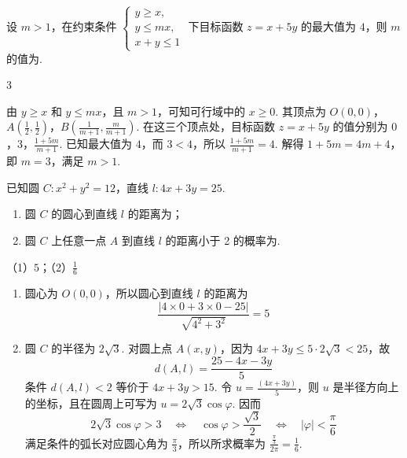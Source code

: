 \begin{problem}
设 \(m > 1\)，在约束条件 \(\begin{cases}
y \geqslant x,\\
y \leqslant mx,\\
x + y \leqslant 1
\end{cases}\) 下目标函数 \(z = x + 5y\) 的最大值为 \(4\)，则 \(m\) 的值为\fillinblank{}.
\end{problem}

\begin{answer}
3
\end{answer}

\begin{solution}
由 \(y\geqslant x\) 和 \(y\leqslant mx\)，且 \(m>1\)，可知可行域中的 \(x\geqslant0\). 其顶点为
\(O(0,0)\)，\(A\left(\frac12,\frac12\right)\)，\(B\left(\frac{1}{m+1},\frac{m}{m+1}\right)\).
在这三个顶点处，目标函数 \(z=x+5y\) 的值分别为
\(0\)，\(3\)，\(\frac{1+5m}{m+1}\).
已知最大值为 \(4\)，而 \(3<4\)，所以
\(\frac{1+5m}{m+1}=4\). 解得 \(1+5m=4m+4\)，即 \(m=3\)，满足 \(m>1\).
\end{solution}

\begin{problem}
已知圆 \(C: x^{2} + y^{2} = 12\)，直线 \(l: 4x + 3y = 25\).
\begin{enumerate}
\item 圆 \(C\) 的圆心到直线 \(l\) 的距离为\fillinblank{}；
\item 圆 \(C\) 上任意一点 \(A\) 到直线 \(l\) 的距离小于 2 的概率为\fillinblank{}.
\end{enumerate}
\end{problem}

\begin{answer}
（1）\(5\)；（2）\(\frac{1}{6}\)
\end{answer}

\begin{solution}
\begin{enumerate}
\item 圆心为 \(O(0,0)\)，所以圆心到直线 \(l\) 的距离为
\[
\frac{|4\times0+3\times0-25|}{\sqrt{4^2+3^2}}=5
\]
\item 圆 \(C\) 的半径为 \(2\sqrt3\). 对圆上点 \(A(x,y)\)，因为
\(4x+3y\leqslant5\cdot2\sqrt3<25\)，故
\[
d(A,l)=\frac{25-4x-3y}{5}
\]
条件 \(d(A,l)<2\) 等价于 \(4x+3y>15\). 令
\(u=\frac{(4x+3y)}{5}\)，则 \(u\) 是半径方向上的坐标，且在圆周上可写为
\(u=2\sqrt3\cos\varphi\). 因而
\[
2\sqrt3\cos\varphi>3
\quad\Longleftrightarrow\quad
\cos\varphi>\frac{\sqrt3}{2}
\quad\Longleftrightarrow\quad
|\varphi|<\frac{\pi}{6}
\]
满足条件的弧长对应圆心角为 \(\frac{\pi}{3}\)，所以所求概率为
\(\frac{\frac{\pi}{3}}{2\pi}=\frac16\).
\end{enumerate}
\end{solution}

